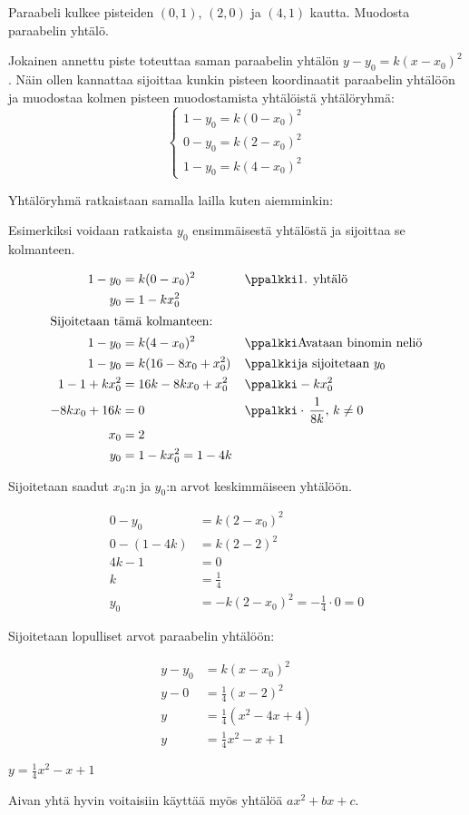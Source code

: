 \begin{esimerkki}
	Paraabeli kulkee pisteiden $(0,1)$, $(2,0)$ ja $(4,1)$ kautta. Muodosta paraabelin yhtälö.
	
	\begin{esimratk} 
		Jokainen annettu piste toteuttaa saman paraabelin yhtälön $y - y_0 = k(x-x_0)^2$. Näin ollen kannattaa sijoittaa kunkin pisteen koordinaatit paraabelin yhtälöön ja muodostaa kolmen pisteen muodostamista yhtälöistä yhtälöryhmä:
		\[
		\left\{
		\begin{aligned}
		1 - y_0 = k(0 - x_0)^2 \\
		0 - y_0 = k(2 - x_0)^2 \\
		1 - y_0 = k(4 - x_0)^2
		\end{aligned}
		\right.
		\]

		Yhtälöryhmä ratkaistaan samalla lailla kuten aiemminkin:
		
		Esimerkiksi voidaan ratkaista $y_0$ ensimmäisestä yhtälöstä ja sijoittaa se kolmanteen.

\begin{align*}
	1 - y_0 &= k(0 - x_0)^2 &&\ppalkki \text{1. yhtälö}\\
	y_0 &= 1- kx^2_0	 \\
    \intertext{Sijoitetaan tämä kolmanteen:}
	1-y_0 &= k(4-x_0)^2 &&\ppalkki \text{Avataan binomin neliö} \\
	1-y_0 &= k(16 - 8x_0 + x_0^2) &&\ppalkki \text{ja sijoitetaan }y_0 \\
	1-1+kx^2_0 &= 16k - 8kx_0 + x^2_0 &&\ppalkki -kx^2_0 \\
	-8kx_0 + 16k &= 0 &&\ppalkki \cdot \, \frac{1}{8k}, \, k \neq 0 \\
	x_0 &= 2 \\
	y_0 &= 1- kx^2_0 = 1 - 4k	
\end{align*}	

		 Sijoitetaan saadut $x_0$:n ja $y_0$:n arvot keskimmäiseen yhtälöön.

\begin{align*}	
	0 - y_0 &= k(2 - x_0)^2 \\
	0 - (1 - 4k) &= k(2-2)^2 \\
	4k -1 &= 0 \\
	k &= \frac{1}{4} \\
	y_0 &= -k(2 - x_0)^2 = - \frac{1}{4} \cdot 0 = 0
\end{align*}

		Sijoitetaan lopulliset arvot paraabelin yhtälöön:

\begin{align*}	
    y - y_0 &= k(x-x_0)^2 \\
	y - 0 &= \frac{1}{4}(x-2)^2 \\
	y &= \frac{1}{4}(x^2-4x+4) \\
	y &= \frac{1}{4}x^2 - x + 1
\end{align*}


		\begin{esimvast}
			$y=\frac{1}{4}x^2 - x + 1$
			
			Aivan yhtä hyvin voitaisiin käyttää myös yhtälöä $ax^2 + bx +c$.
		\end{esimvast}


	\end{esimratk}
\end{esimerkki}
